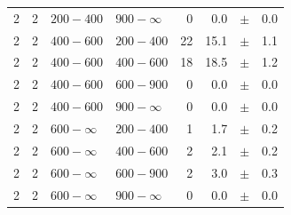 \begin{table}[!h]
\begin{tabular}{rrllrrcl}
2 & 2 & $ 200- 400$ & $900-\infty$ &      0 &      0.0 &$\pm$&    0.0 \\
2 & 2 & $ 400- 600$ & $200-400$ &     22 &     15.1 &$\pm$&    1.1 \\
2 & 2 & $ 400- 600$ & $400-600$ &     18 &     18.5 &$\pm$&    1.2 \\
2 & 2 & $ 400- 600$ & $600-900$ &      0 &      0.0 &$\pm$&    0.0 \\
2 & 2 & $ 400- 600$ & $900-\infty$ &      0 &      0.0 &$\pm$&    0.0 \\
2 & 2 & $ 600- \infty$ & $200-400$ &      1 &      1.7 &$\pm$&    0.2 \\
2 & 2 & $ 600- \infty$ & $400-600$ &      2 &      2.1 &$\pm$&    0.2 \\
2 & 2 & $ 600- \infty$ & $600-900$ &      2 &      3.0 &$\pm$&    0.3 \\
2 & 2 & $ 600- \infty$ & $900-\infty$ &      0 &      0.0 &$\pm$&    0.0 \\
    \hline
  \end{tabular}
\end{table}

